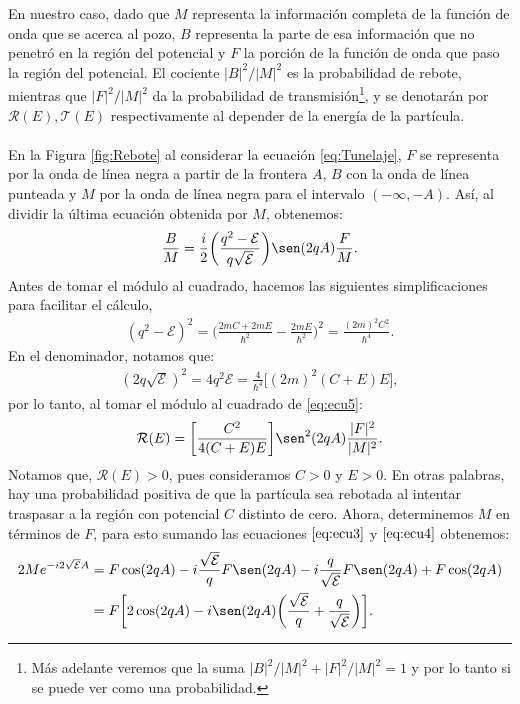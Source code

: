 \documentclass[12pt]{article}
\theoremstyle{definition}
\begin{document}
En nuestro caso, dado que $M$ representa la información completa de la función de onda que se acerca al pozo, $B$ representa la parte de esa información que no penetró en la región del potencial y $F$ la porción de la función de onda que paso la región del potencial.  El cociente $|B|^2/|M|^2$ es la probabilidad de rebote, mientras que $|F|^2/|M|^2$ da la probabilidad de transmisión\footnote{Más adelante veremos que la suma $|B|^2/|M|^2 + |F|^2/|M|^2 =1$ y por lo tanto si se puede ver como una probabilidad.}, y se denotarán por $\mathcal{R}(E), \mathcal{T}(E)$ respectivamente al depender de la energía de la partícula. 
\\ \\
En la Figura \ref{fig:Rebote} al considerar la ecuación \eqref{eq:Tunelaje}, $F$ se representa por la onda de línea negra a partir de la frontera $A$, $B$ con la onda de línea punteada y $M$ por la onda de línea negra para el intervalo $(-\infty, -A)$. Así, al dividir la última ecuación obtenida por $M$, obtenemos:
\begin{align}
    \frac{B}{M} = \frac{i}{2}\bigg(\frac{q^2-\mathcal{E}}{q\sqrt{\mathcal{E}}}\bigg)\sen(2qA)\frac{F}{M}.
    \label{eq:ecu5}
\end{align}
Antes de tomar el módulo al cuadrado,  hacemos las siguientes simplificaciones para facilitar el cálculo,
\begin{align*}
    (q^2-\mathcal{E})^2 =
    \bigg(\frac{2mC+2mE}{\hslash^2}-\frac{2mE}{\hslash^2}\bigg)^2 =
    \frac{(2m)^2C^2}{\hslash^4}.
\end{align*}
En el denominador, notamos que:
\begin{align*}
    (2q\sqrt{\mathcal{E}})^2 = 4q^2\mathcal{E} =
    \frac{4}{\hslash^4}\bigg[(2m)^2(C+E)E\bigg],
\end{align*}
por lo tanto, al tomar el módulo al cuadrado de \eqref{eq:ecu5}:
\begin{align*}
    \mathcal{R}(E) = \bigg[\frac{C^2}{4(C+E)E}\bigg]\sen^2(2qA)\frac{|F|^2}{|M|^2}.
\end{align*}
Notamos que, $\mathcal{R}(E)>0$, pues consideramos $C > 0$ y $E>0$. En otras palabras, hay una probabilidad positiva de que la partícula sea rebotada al intentar traspasar a la región con potencial $C$ distinto de cero. Ahora, determinemos $M$ en términos de $F$, para esto sumando las ecuaciones $\eqref{eq:ecu3}$ y $\eqref{eq:ecu4}$ obtenemos:
\begin{align*}
    2Me^{-i2\sqrt{\mathcal{E}}A} & =
    F\cos(2qA) - i\frac{\sqrt{\mathcal{E}}}{q}F\sen(2qA) -i\frac{q}{\sqrt{\mathcal{E}}}F\sen(2qA)+F\cos(2qA)
    \\
    & =
    F\bigg[2\cos(2qA)-i\sen(2qA)\bigg(\frac{\sqrt{\mathcal{E}}}{q} + \frac{q}{\sqrt{\mathcal{E}}}
    \bigg)\bigg].
\end{align*}
\end{document}
